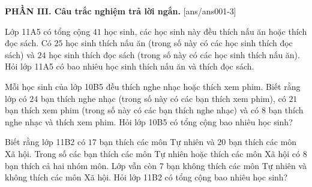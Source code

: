 \documentclass[12pt,a4paper]{article}
\begin{document}
{\bf PHẦN III. Câu trắc nghiệm trả lời ngắn.}
\setcounter{ex}{0}
[ans/ans001-3]
\begin{ex}
 Lớp 11A5 có tổng cộng ${41}$ học sinh, các học sinh này đều thích nấu ăn hoặc thích đọc sách. Có ${25}$ học sinh thích nấu ăn (trong số này có các học sinh thích đọc sách) và ${24}$ học sinh thích đọc sách (trong số này có các học sinh thích nấu ăn). Hỏi lớp 11A5 có bao nhiêu học sinh thích nấu ăn và thích đọc sách.

\end{ex}

\begin{ex}
 Mỗi học sinh của lớp 10B5 đều thích nghe nhạc hoặc thích xem phim. Biết rằng lớp có ${24}$ bạn thích nghe nhạc (trong số này có các bạn thích xem phim), có ${21}$ bạn thích xem phim (trong số này có các bạn thích nghe nhạc) và có ${8}$ bạn thích nghe nhạc và thích xem phim. Hỏi lớp 10B5 có tổng cộng bao nhiêu học sinh?

\end{ex}

\begin{ex}
 Biết rằng lớp 11B2 có ${17}$ bạn thích các môn Tự nhiên và ${20}$ bạn thích các môn Xã hội. Trong số các bạn thích các môn Tự nhiên hoặc thích các môn Xã hội có ${8}$ bạn thích cả hai nhóm môn. Lớp vẫn còn ${7}$ bạn không thích các môn Tự nhiên và không thích các môn Xã hội. Hỏi lớp 11B2 có tổng cộng bao nhiêu học sinh?

\end{ex}
\end{document}
